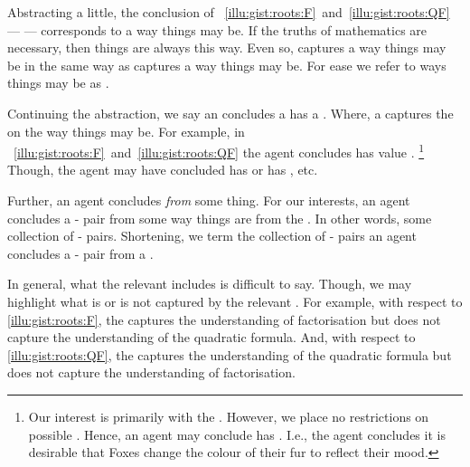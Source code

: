 \begin{note}
  Abstracting a little, the conclusion of ~\ref{illu:gist:roots:F}~and~\ref{illu:gist:roots:QF} --- \propM{\rootsCon{}} --- corresponds to a way things may be.
  If the truths of mathematics are necessary, then things are always this way.
  Even so, \propM{\rootsCon{}} captures a way things may be in the same way as  captures a way things may be.
  For ease we refer to ways things may be as \emph{}.

  Continuing the abstraction, we say an \agents{} concludes a  has a \emph{}.
  Where, a  captures the \agpe{} on the way things may be.
  For example, in ~\ref{illu:gist:roots:F}~and~\ref{illu:gist:roots:QF} the agent concludes \propM{\rootsCon{}} has value .%
  \footnote{
    Our interest is primarily with the \val{} .
    However, we place no restrictions on possible .
    Hence, an agent may conclude  has \val{} .
    I.e., the agent concludes it is desirable that Foxes change the colour of their fur to reflect their mood.
  }
  Though, the agent may have concluded \propM{\rootsCon{}} has \val{}  or \propM{\rootsConBad{}} has \val{} , etc.
\end{note}


\begin{note}
  Further, an agent concludes \emph{from} some thing.
  For our interests, an agent concludes a \prop{}-\val{} pair from some way things are from the \agpe{}.
  In other words, some collection of \prop{}-\val{} pairs.
  Shortening, we term the collection of \prop{}-\val{} pairs an agent concludes a \prop{}-\val{} pair from a \emph{\pool{}}.

  In general, what the relevant \pool{} includes is difficult to say.
  Though, we may highlight what is or is not captured by the relevant \pool{}.
  For example, with respect to \autoref{illu:gist:roots:F}, the \pool{} captures the \agents{} understanding of factorisation but does not capture the \agents{} understanding of the quadratic formula.
  And, with respect to \autoref{illu:gist:roots:QF}, the \pool{} captures the \agents{} understanding of the quadratic formula but does not capture the \agents{} understanding of factorisation.
\end{note}


